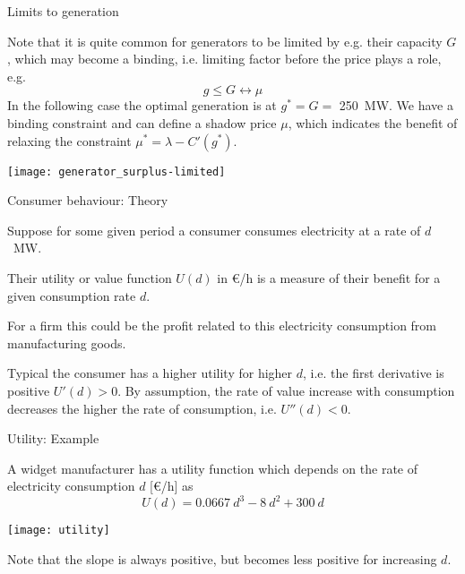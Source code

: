\documentclass[10pt,aspectratio=169,dvipsnames]{beamer}
\def\l{\lambda}
\def\m{\mu}
\begin{document}
\begin{frame}{Limits to generation}


  Note that it is quite common for generators to be limited by
  e.g. their capacity $G$, which may become a \alert{binding}, i.e. limiting factor before the price plays a role, e.g.
  \begin{equation*}
    g \leq G  \leftrightarrow \m
  \end{equation*}
  In the following case the optimal generation is at
  $g^* = G = $ 250~MW.   We have a \alert{binding} constraint and can define a \alert{shadow price} $\m$, which indicates the benefit of relaxing the constraint $\m^* = \l - C'(g^*)$.


  \centering
  \texttt{[image: generator\_surplus-limited]}

\end{frame}




\begin{frame}{Consumer behaviour: Theory}

  Suppose for some given period a consumer consumes electricity at a rate of
  $d$~MW.


  Their \alert{utility or value function} $U(d)$ in \euro/h is a
  measure of their benefit for a given consumption rate $d$.

  For a firm this could be the profit related to this electricity
  consumption from manufacturing goods.


  Typical the consumer has a higher utility for higher $d$, i.e. the
  first derivative is positive $U'(d) > 0$. By assumption, the rate of
  value increase with consumption decreases the higher the rate of
  consumption, i.e. $U''(d) < 0$.

\end{frame}


\begin{frame}{Utility: Example}


  A widget manufacturer has a utility function which depends on the
  rate of electricity consumption $d$ [\euro/h] as
  \begin{equation*}
    U(d) = 0.0667~d^3  - 8~d^2 + 300~d
  \end{equation*}


  \centering
  \texttt{[image: utility]}

  \raggedright
  Note that the slope is always positive, but becomes less positive
  for increasing $d$.
\end{frame}
\end{document}
